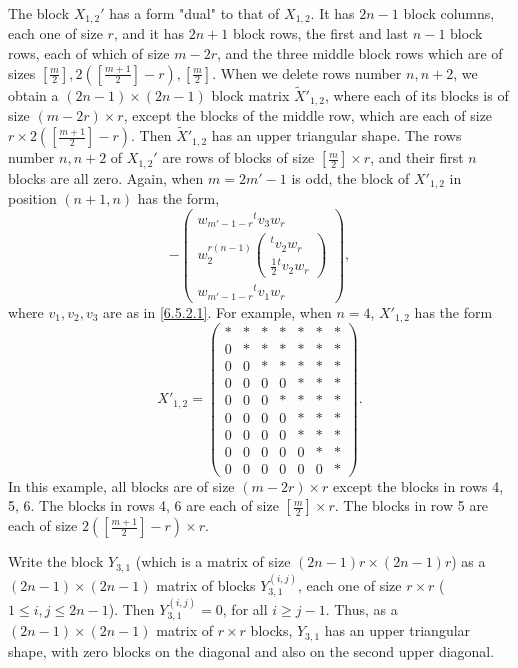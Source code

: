 \documentclass[12pts]{amsart}
\begin{document}
The block $X_{1,2}'$ has a form "dual" to that of $X_{1,2}$. It has $2n-1$
block columns, each one of size $r$, and it has $2n+1$ block rows,
the first and last $n-1$ block rows, each of which of size $m-2r$, and
the three middle block rows which are of sizes $[\frac{m}{2}],2([\frac{m+1}{2}]-r),[\frac{m}{2}]$. When we delete
rows number $n, n+2$, we obtain a $(2n-1)\times (2n-1)$ block matrix $\tilde{X}'_{1,2}$,
where each of its blocks is of size $(m-2r)\times r$, except the blocks of the middle row, which are each of size $r\times 2([\frac{m+1}{2}]-r)$.  Then $\tilde{X}'_{1,2}$ has an upper triangular shape. The rows number $n, n+2$ of $X_{1,2}'$ are rows of blocks of size
$[\frac{m}{2}]\times r$, and their first $n$ blocks are all zero. Again, when $m=2m'-1$ is odd, the block of $X'_{1,2}$ in position $(n+1,n)$ has the form, 
\begin{equation}\label{6.5.3.1}
-\begin{pmatrix}w_{m'-1-r}{}^tv_3w_r\\w_2^{r(n-1)}\begin{pmatrix}{}^tv_2w_r\\ \frac{1}{2}{}^tv_2w_r\end{pmatrix}\\w_{m'-1-r}{}^tv_1w_r\end{pmatrix},
\end{equation}
where $v_1,v_2,v_3$ are as in \eqref{6.5.2.1}. For example, when $n=4$, $X'_{1,2}$ has the form
\begin{equation}\label{6.5.4}
X'_{1,2}=\begin{pmatrix}\ast&\ast&\ast&\ast&\ast&\ast&\ast\\
0&\ast&\ast&\ast&\ast&\ast&\ast\\
0&0&\ast&\ast&\ast&\ast&\ast\\
0&0&0&0&\ast&\ast&\ast\\
0&0&0&\ast&\ast&\ast&\ast\\
0&0&0&0&\ast&\ast&\ast\\
0&0&0&0&\ast&\ast&\ast\\
0&0&0&0&0&\ast&\ast\\
0&0&0&0&0&0&\ast\end{pmatrix}. 
\end{equation}
In this example, all blocks are of size $(m-2r)\times r$ except the
blocks in rows 4, 5, 6. The blocks in rows 4, 6 are each of size $[\frac{m}{2}]\times r$. The blocks in row 5 are each of size $2([\frac{m+1}{2}]-r)\times r$.

Write the block $Y_{3,1}$ (which is a matrix of size $(2n-1)r\times
(2n-1)r$) as a $(2n-1)\times (2n-1)$ matrix of blocks
$Y_{3,1}^{(i,j)}$, each one of size $r\times r$ ($1\leq i,j\leq
2n-1$). Then $Y_{3,1}^{(i,j)}=0$, for all $i\geq j-1$. Thus, as a
$(2n-1)\times (2n-1)$ matrix of $r\times r$ blocks, $Y_{3,1}$ has an
upper triangular shape, with zero blocks on the diagonal and also on
the second upper diagonal.
\end{document}
